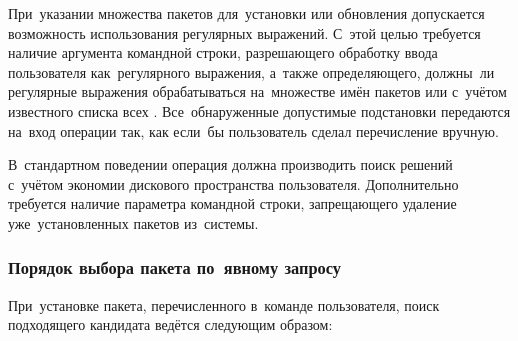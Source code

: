 При~указании множества пакетов для~установки или обновления  допускается возможность использования регулярных выражений.
С~этой целью требуется наличие аргумента командной строки,  
разрешающего обработку ввода пользователя как~регулярного выражения,
а~также определяющего,  должны~ли регулярные выражения обрабатываться на~множестве имён пакетов или с~учётом известного списка всех .
Все~обнаруженные допустимые подстановки передаются на~вход операции так, как если~бы пользователь сделал перечисление вручную.

В~стандартном поведении операция должна производить поиск решений с~учётом экономии дискового пространства пользователя. 
Дополнительно требуется наличие параметра командной строки, запрещающего удаление уже~установленных пакетов из~системы. 

\subsubsection{Порядок выбора пакета по~явному запросу}

При~установке пакета, перечисленного в~команде пользователя, поиск подходящего кандидата ведётся следующим образом:

